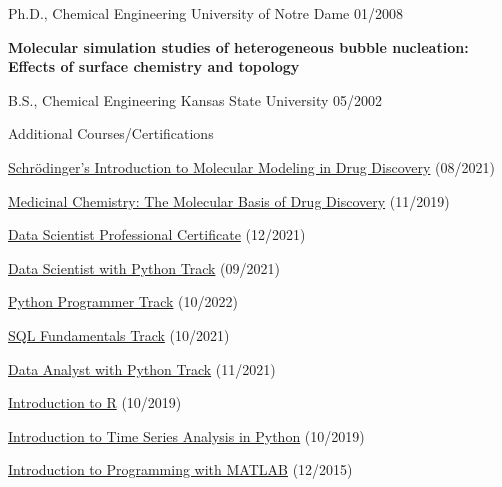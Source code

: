 
\begin{cventries}
  \cventry
    {Ph.D., Chemical Engineering} %
    {University of Notre Dame} %
    {} %
    {01/2008} %
    {
      \begin{cvitems} %
         \item {\textbf{Molecular simulation studies of heterogeneous bubble nucleation: Effects of surface chemistry and topology}}
      \end{cvitems}
    }
    
    \cventry
      {B.S., Chemical Engineering}
      {Kansas State University}
      {}
      {05/2002}
      {}

  \vspace{-10pt}
      
  \cventry
    {}
    {Additional Courses/Certifications}
    {}
    {}
    {
        \begin{cvitems}
            \item{\href{https://api.badgr.io/public/assertions/zZ7-bHnkTcm6H_UNr2s-LA}{Schrödinger's Introduction to Molecular Modeling in Drug Discovery} (08/2021)}           
            \item{\href{https://courses.edx.org/certificates/27307d91954041dab94af0ff554bc378}{Medicinal Chemistry: The Molecular Basis of Drug Discovery} (11/2019)}
            \item{\href{https://www.datacamp.com/certificate/DS0010628355005}{Data Scientist Professional Certificate} (12/2021)}            
            \item{\href{https://www.datacamp.com/statement-of-accomplishment/track/2bb866790e6f6cda38fbc31ede0fb670e8c3bd5e}{Data Scientist with Python Track} (09/2021)}
            \item{\href{https://www.datacamp.com/statement-of-accomplishment/track/3db21ff7d3d457f58a1709b465052edf84cdd313}{Python Programmer Track} (10/2022)}
            \item{\href{https://www.datacamp.com/statement-of-accomplishment/track/941904e6394e2951693441d466f4643e5edfb4de}{SQL Fundamentals Track} (10/2021)}
            \item{\href{https://www.datacamp.com/statement-of-accomplishment/track/58a2874f38ce2a5127d0f39e7a4d5ee36bf86349}{Data Analyst with Python Track} (11/2021)}
            \item{\href{https://www.datacamp.com/statement-of-accomplishment/course/dd5746b9564cf374bcc0bb379e1801925e25259e}{Introduction to R} (10/2019)}
            \item{\href{https://www.datacamp.com/statement-of-accomplishment/course/807548ea866063da3c0083afcebf3be48d44f277}{Introduction to Time Series Analysis in Python} (10/2019)}
            \item {\href{https://www.coursera.org/account/accomplishments/verify/9G7V69L6QP}{Introduction to Programming with MATLAB} (12/2015)}
        \end{cvitems}      
    }

\end{cventries}
